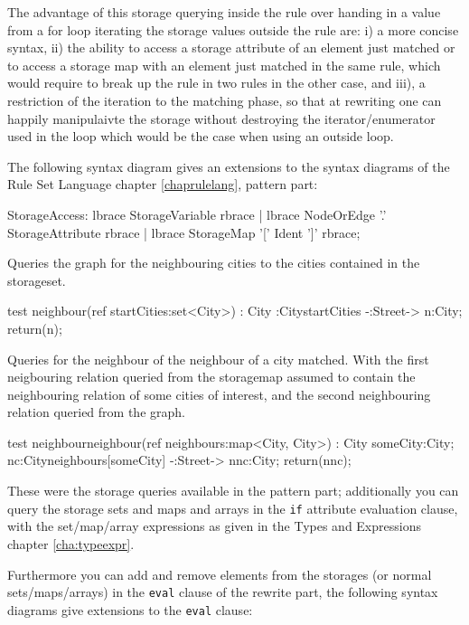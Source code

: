 The advantage of this storage querying inside the rule over handing in a value from a for loop iterating the storage values outside the rule are: i) a more concise syntax, ii) the ability to access a storage attribute of an element just matched or to access a storage map with an element just matched in the same rule, which would require to break up the rule in two rules in the other case, and iii), a restriction of the iteration to the matching phase, so that at rewriting one can happily manipulaivte the storage without destroying the iterator/enumerator used in the loop which would be the case when using an outside loop.

The following syntax diagram gives an extensions to the syntax diagrams of the Rule Set Language chapter \ref{chaprulelang}, pattern part:
\begin{rail}
  StorageAccess:
    lbrace StorageVariable rbrace |
    lbrace NodeOrEdge '.' StorageAttribute rbrace |
    lbrace StorageMap '[' Ident ']' rbrace;
\end{rail}

\begin{example}
Queries the graph for the neighbouring cities to the cities contained in the storageset.
\begin{grgen}
test neighbour(ref startCities:set<City>) : City
{
    :City{startCities} -:Street-> n:City;
    return(n);
}
\end{grgen}
\end{example}

\begin{example}
Queries for the neighbour of the neighbour of a city matched.
With the first neigbouring relation queried from the storagemap assumed to contain the neighbouring relation of some cities of interest, and the second neighbouring relation queried from the graph.
\begin{grgen}
test neighbourneighbour(ref neighbours:map<City, City>) : City
{
    someCity:City;
    nc:City{neighbours[someCity]} -:Street-> nnc:City;
    return(nnc);
}
\end{grgen}
\end{example}

These were the storage queries available in the pattern part; 
additionally you can query the storage sets and maps and arrays in the \texttt{if} attribute evaluation clause,
with the set/map/array expressions as given in the Types and Expressions chapter \ref{cha:typeexpr}.

Furthermore you can add and remove elements from the storages (or normal sets/maps/arrays) in the \texttt{eval} clause of the rewrite part, the following syntax diagrams give extensions to the \texttt{eval} clause:

